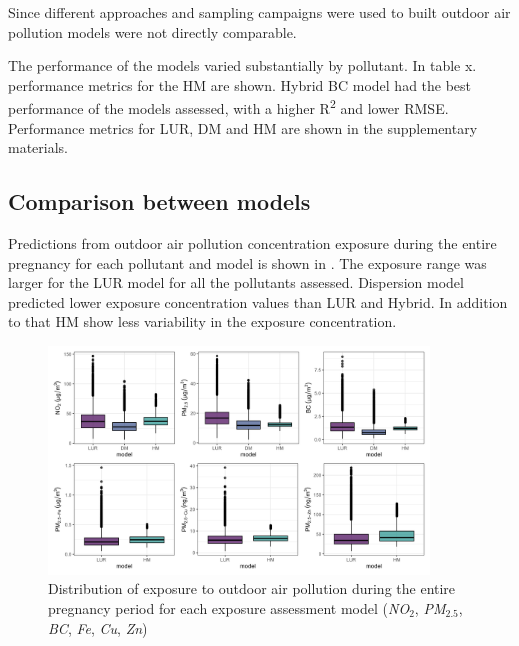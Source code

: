 \documentclass{article}
\begin{document}
Since different approaches and sampling campaigns were used to built outdoor air pollution models were not directly comparable. 

The performance of the models varied substantially by pollutant. In table x. performance metrics for the HM are shown. Hybrid BC model had the best performance of the models assessed, with a higher R\textsuperscript{2} and lower RMSE. Performance metrics for LUR, DM and HM are shown in the supplementary materials. 

\newpage

\subsection{Comparison between models} %

Predictions from outdoor air pollution concentration exposure during the entire pregnancy for each pollutant and model is shown in . The exposure range was larger for the LUR model for all the pollutants assessed. Dispersion model predicted lower exposure concentration values than LUR and Hybrid. In addition to that HM show less variability in the exposure concentration.

\begin{figure}[!htb]
\includegraphics[width=0.9\textwidth]{figures/boxplot_all_models_estimates.png}
\caption{Distribution of exposure to outdoor air pollution during the entire pregnancy period for each exposure assessment model (\textit{NO$_2$}, \textit{PM$_{2.5}$}, \textit{BC}, \textit{Fe}, \textit{Cu}, \textit{Zn})}
\label{fig2}
\end{figure}
\end{document}
